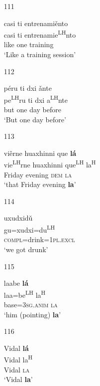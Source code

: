 \begin{itemize}
\item[111]
 
\glll   casi ti entrenami\v{e}nto \\
  casi ti entrenamie\textsuperscript{LH}nto \\
  like one training \\
\glt `Like a training session'
 

\item[112]

\glll p\'{e}ru ti dxi \v{a}nte  \\
pe\textsuperscript{LH}ru ti dxi a\textsuperscript{LH}nte  \\
but one day before  \\
\glt  `But one day before'



\item[113]

\glll vi\v{e}rne huaxhinni que \textbf{l\'{a}}  \\
vie\textsuperscript{LH}rne huaxhinni que\textsuperscript{LH} la\textsuperscript{H}  \\
Friday evening \textsc{dem} \textsc{la}  \\
\glt  `that Friday evening \textbf{la}'



\item[114]

\glll uxudxid\v{u}  \\
gu=xudxi=du\textsuperscript{LH}  \\
\textsc{compl}=drink=1\textsc{pl.excl}  \\
\glt  `we got drunk'



\item[115]

\glll laabe \textbf{l\'{a}}  \\
laa=be\textsuperscript{LH} la\textsuperscript{H}  \\
base=3\textsc{sg.anim} \textsc{la}  \\
\glt  `him (pointing) \textbf{la}'



\item[116]

\glll Vidal \textbf{l\'{a}}  \\
Vidal la\textsuperscript{H}  \\
Vidal \textsc{la}  \\
\glt  `Vidal \textbf{la}'




\end{itemize}
